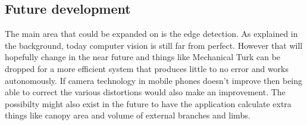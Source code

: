 \subsection{Future development}
The main area that could be expanded on is the edge detection. As explained in the background, today computer vision is still far from perfect. However that will hopefully change in the near future and things like Mechanical Turk can be dropped for a more efficient system that produces little to no error and works autonomously. If camera technology in mobile phones doesn't improve then being able to correct the various distortions would also make an improvement. The possibilty might also exist in the future to have the application calculate extra things like canopy area and volume of external branches and limbs.

